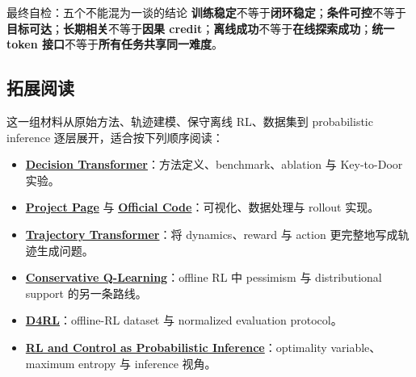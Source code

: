 \documentclass[a4paper]{article}
\begin{document}
\begin{warningbox}{最终自检：五个不能混为一谈的结论}
\textbf{训练稳定}不等于\textbf{闭环稳定}；\textbf{条件可控}不等于\textbf{目标可达}；\textbf{长期相关}不等于\textbf{因果 credit}；\textbf{离线成功}不等于\textbf{在线探索成功}；\textbf{统一 token 接口}不等于\textbf{所有任务共享同一难度}。
\end{warningbox}

\subsection{拓展阅读}

这一组材料从原始方法、轨迹建模、保守离线 RL、数据集到 probabilistic inference 逐层展开，适合按下列顺序阅读：

{\small
\begin{itemize}[nosep,leftmargin=*]
  \item \href{https://arxiv.org/abs/2106.01345}{\textbf{Decision Transformer}}：方法定义、benchmark、ablation 与 Key-to-Door 实验。
  \item \href{https://sites.google.com/berkeley.edu/decision-transformer}{\textbf{Project Page}} 与 \href{https://github.com/kzl/decision-transformer}{\textbf{Official Code}}：可视化、数据处理与 rollout 实现。
  \item \href{https://arxiv.org/abs/2106.02039}{\textbf{Trajectory Transformer}}：将 dynamics、reward 与 action 更完整地写成轨迹生成问题。
  \item \href{https://arxiv.org/abs/2006.04779}{\textbf{Conservative Q-Learning}}：offline RL 中 pessimism 与 distributional support 的另一条路线。
  \item \href{https://arxiv.org/abs/2004.07219}{\textbf{D4RL}}：offline-RL dataset 与 normalized evaluation protocol。
  \item \href{https://arxiv.org/abs/1805.00909}{\textbf{RL and Control as Probabilistic Inference}}：optimality variable、maximum entropy 与 inference 视角。
\end{itemize}
}
\end{document}
